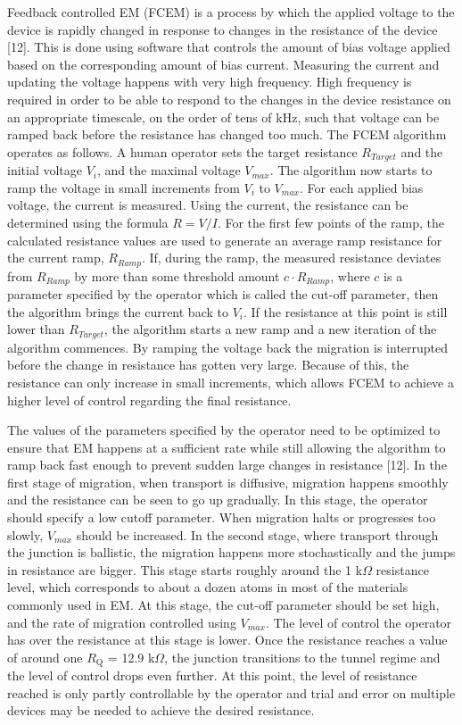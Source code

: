 Feedback controlled EM (FCEM) is a process by which the applied voltage to the device is rapidly changed in response to changes in the resistance of the device [12]. This is done using software that controls the amount of bias voltage applied based on the corresponding amount of bias current. Measuring the current and updating the voltage happens with very high frequency. High frequency is required in order to be able to respond to the changes in the device resistance on an appropriate timescale, on the order of tens of kHz, such that voltage can be ramped back before the resistance has changed too much. The FCEM algorithm operates as follows. A human operator sets the target resistance $R_{Target}$ and the initial voltage $V_i$, and the maximal voltage $V_{max}$. The algorithm now starts to ramp the voltage in small increments from $V_i$ to $V_{max}$. For each applied bias voltage, the current is measured. Using the current, the resistance can be determined using the formula $R = V/I$. For the first few points of the ramp, the calculated resistance values are used to generate an average ramp resistance for the current ramp, $R_{Ramp}$. If, during the ramp, the measured resistance deviates from $R_{Ramp}$ by more than some threshold amount $c \cdot R_{Ramp}$, where $c$ is a parameter specified by the operator which is called the cut-off parameter, then the algorithm brings the current back to $V_i$. If the resistance at this point is still lower than $R_{Target}$, the algorithm starts a new ramp and a new iteration of the algorithm commences. By ramping the voltage back the migration is interrupted before the change in resistance has gotten very large. Because of this, the resistance can only increase in small increments, which allows FCEM to achieve a higher level of control regarding the final resistance. 

The values of the parameters specified by the operator need to be optimized to ensure that EM happens at a sufficient rate while still allowing the algorithm to ramp back fast enough to prevent sudden large changes in resistance [12]. In the first stage of migration, when transport is diffusive, migration happens smoothly and the resistance can be seen to go up gradually. In this stage, the operator should specify a low cutoff parameter. When migration halts or progresses too slowly, $V_{max}$ should be increased. In the second stage, where transport through the junction is ballistic, the migration happens more stochastically and the jumps in resistance are bigger. This stage starts roughly around the 1 k$\Omega$ resistance level, which corresponds to about a dozen atoms in most of the materials commonly used in EM. At this stage, the cut-off parameter should be set high, and the rate of migration controlled using $V_{max}$. The level of control the operator has over the resistance at this stage is lower. Once the resistance reaches a value of around one $R_\textrm{Q}$ = 12.9 k$\Omega$, the junction transitions to the tunnel regime and the level of control drops even further. At this point, the level of resistance reached is only partly controllable by the operator and trial and error on multiple devices may be needed to achieve the desired resistance.
\\

